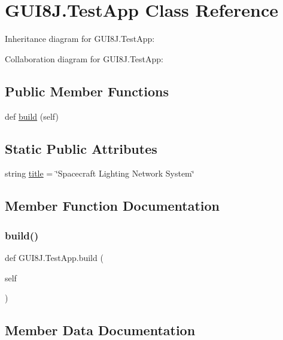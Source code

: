 \hypertarget{classGUI8J_1_1TestApp}{}\section{G\+U\+I8\+J.\+Test\+App Class Reference}
\label{classGUI8J_1_1TestApp}


Inheritance diagram for G\+U\+I8\+J.\+Test\+App\+:


Collaboration diagram for G\+U\+I8\+J.\+Test\+App\+:
\subsection*{Public Member Functions}
\begin{DoxyCompactItemize}
\item 
def \hyperlink{classGUI8J_1_1TestApp_a2b48503b57bdfb7a248eac843289ca19}{build} (self)
\end{DoxyCompactItemize}
\subsection*{Static Public Attributes}
\begin{DoxyCompactItemize}
\item 
string \hyperlink{classGUI8J_1_1TestApp_aa384dff838ce270ea69b1b8bbb7a8a57}{title} = \char`\"{}Spacecraft Lighting Network System\char`\"{}
\end{DoxyCompactItemize}


\subsection{Member Function Documentation}
\mbox{\label{classGUI8J_1_1TestApp_a2b48503b57bdfb7a248eac843289ca19}} 
\subsubsection{\texorpdfstring{build()}{build()}}
{\footnotesize\ttfamily def G\+U\+I8\+J.\+Test\+App.\+build (\begin{DoxyParamCaption}\item[{}]{self }\end{DoxyParamCaption})}



\subsection{Member Data Documentation}
\mbox{\label{classGUI8J_1_1TestApp_aa384dff838ce270ea69b1b8bbb7a8a57}} 
